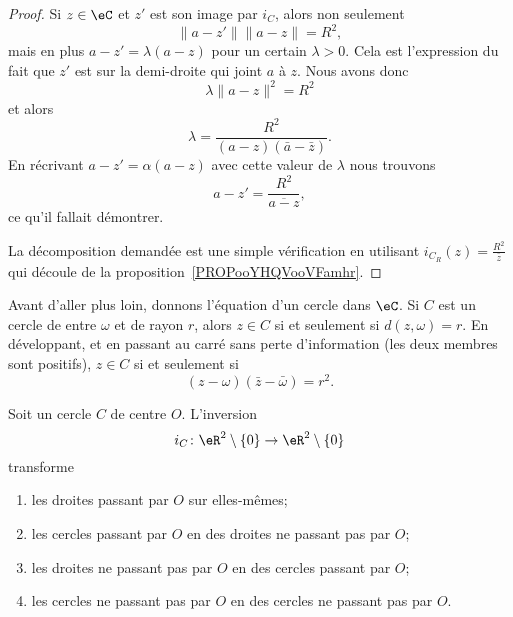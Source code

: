 \begin{proof}
	Si \( z\in \eC\) et \( z'\) est son image par \( i_C\), alors non seulement
	\begin{equation}
		\| a-z' \|\| a-z \|=R^2,
	\end{equation}
	mais en plus \( a-z'=\lambda(a-z)\) pour un certain \( \lambda>0\). Cela est l'expression du fait que \( z'\) est sur la demi-droite qui joint \( a\) à \( z\). Nous avons donc
	\begin{equation}
		\lambda\| a-z \|^2=R^2
	\end{equation}
	et alors
	\begin{equation}
		\lambda=\frac{ R^2 }{ (a-z)(\bar a-\bar z) }.
	\end{equation}
	En récrivant \( a-z'=\alpha(a-z)\) avec cette valeur de \( \lambda\) nous trouvons
	\begin{equation}
		a-z'=\frac{ R^2 }{ \overline{ a-z } },
	\end{equation}
	ce qu'il fallait démontrer.

	La décomposition demandée est une simple vérification en utilisant \( i_{C_R}(z)=\frac{ R^2 }{ \bar z }\) qui découle de la proposition~\ref{PROPooYHQVooVFamhr}.
\end{proof}

Avant d'aller plus loin, donnons l'équation d'un cercle dans \( \eC\). Si \( C\) est un cercle de entre \( \omega\) et de rayon \( r\), alors \( z\in C\) si et seulement si \( d(z,\omega)=r\). En développant, et en passant au carré sans perte d'information (les deux membres sont positifs), \( z\in C\) si et seulement si
\begin{equation}
	(z-\omega)(\bar z-\bar \omega)=r^2.
\end{equation}

\begin{proposition}     \label{PROPooMIMRooTbQRVI}
	Soit un cercle \( C\) de centre \( O\). L'inversion
	\begin{equation}
		i_C\colon \eR^2\setminus\{ 0 \}\to \eR^2\setminus\{ 0 \}
	\end{equation}
	transforme
	\begin{enumerate}
		\item       \label{ITEMooNOXMooQYNPnv}
		      les droites passant par \( O\) sur elles-mêmes;
		\item
		      les cercles passant par \( O\) en des droites ne passant pas par \( O\);
		\item       \label{ITEMooRFPSooGdJdHD}
		      les droites ne passant pas par \( O\) en des cercles passant par \( O\);
		\item
		      les cercles ne passant pas par \( O\) en des cercles ne passant pas par \( O\).
	\end{enumerate}
\end{proposition}

